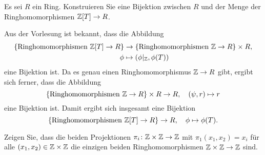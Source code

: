 \begin{question}
  Es sei $R$ ein Ring.
  Konstruieren Sie eine Bijektion zwischen $R$ und der Menge der Ringhomomorphismen $\mathbb{Z}[T] \to R$.
\end{question}


\begin{solution}
  Aus der Vorlesung ist bekannt, dass die Abbildung
  \begin{align*}
              \{ \text{Ringhomomorphismen $\mathbb{Z}[T] \to R$} \}
    &\to      \{ \text{Ringhomomorphismen $\mathbb{Z} \to R$} \} \times R,
    \\
              \phi
    &\mapsto  (\phi|_{\mathbb{Z}}, \phi(T))
  \end{align*}
  eine Bijektion ist.
  Da es genau einen Ringhomomorphismus $\mathbb{Z} \to R$ gibt, ergibt sich ferner, dass die Abbildung
  \[
            \{ \text{Ringhomomorphismen $\mathbb{Z} \to R$} \} \times R
    \to     R,
    \quad
            (\psi, r)
    \mapsto r
  \]
  eine Bijektion ist.
  Damit ergibt sich insgesamt eine Bijektion
  \[
            \{ \text{Ringhomomorphismen $\mathbb{Z}[T] \to R$} \}
    \to     R,
    \quad
            \phi
    \mapsto \phi(T).
  \]
\end{solution}


\begin{question}[subtitle = Die einzigen Ringhomomorphismen $\Integer \times \Integer \to \Integer$]
  Zeigen Sie, dass die beiden Projektionen $\pi_i \colon \mathbb{Z} \times \mathbb{Z} \to \mathbb{Z}$ mit $\pi_1(x_1 , x_2) = x_i$ für alle $(x_1, x_2) \in \mathbb{Z} \times \mathbb{Z}$ die einzigen beiden Ringhomomorphismen $\Integer \times \Integer \to \Integer$ sind.
\end{question}


